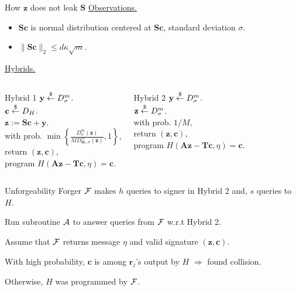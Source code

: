 \begin{frame}{How $\mathbf{z}$ does not leak $\mathbf{S}$}
	\underline{Observations.}
	\begin{itemize}
		\item $\mathbf{S}\mathbf{c}$ is normal distribution centered at $\mathbf{S}\mathbf{c}$, standard deviation $\sigma$.
		\item $\lVert\mathbf{S}\mathbf{c}\rVert_2 \leq d\kappa \sqrt{m}$.
	\end{itemize}
	
	\underline{Hybrids.}
	\begin{columns}[c]
		\begin{expt}{Hybrid 1}
			$\mathbf{y} \stackrel{\$}{\leftarrow} D_\sigma^m$.\\
			$\mathbf{c} \stackrel{\$}{\leftarrow} D_H$.\\
			$\mathbf{z} := \mathbf{S}\mathbf{c} + \mathbf{y}$.\\
			with prob. $\min\left\{\frac{D^m_\sigma(\mathbf{z})}{MD^m_{\mathbf{S}\mathbf{c},\sigma}(\mathbf{z})},1\right\}$,\\
			\qquad return $(\mathbf{z}, \mathbf{c})$, \\
			\qquad program $H(\mathbf{A}\mathbf{z} - \mathbf{T}\mathbf{c}, \eta) = \mathbf{c}$.\\
		\end{expt}
		\begin{expt}{Hybrid 2}
			$\mathbf{y} \stackrel{\$}{\leftarrow} D_\sigma^m$.\\
			$\mathbf{z} \stackrel{\$}{\leftarrow} D_\sigma^m$.\\
			with prob. $1/M$,\\
			\qquad return $(\mathbf{z}, \mathbf{c})$, \\
			\qquad program $H(\mathbf{A}\mathbf{z} - \mathbf{T}\mathbf{c}, \eta) = \mathbf{c}$.\\
		\end{expt}
	\end{columns}
\end{frame}
\begin{frame}{Unforgeability} 
	Forger $\mathcal{F}$ makes $h$ queries to signer in Hybrid 2 and, $s$ queries to $H$. 
	
	Run subroutine $\mathcal{A}$ to answer queries from $\mathcal{F}$ w.r.t Hybrid 2.
	
	Assume that $\mathcal{F}$ returns message $\eta$ and valid signature $(\mathbf{z}, \mathbf{c})$.
	
	With high probability, $\mathbf{c}$ is among $\mathbf{r}_j$'s output by $H$ $\Rightarrow$ found collision. 
	
	Otherwise, $H$ was programmed by $\mathcal{F}$.
\end{frame}